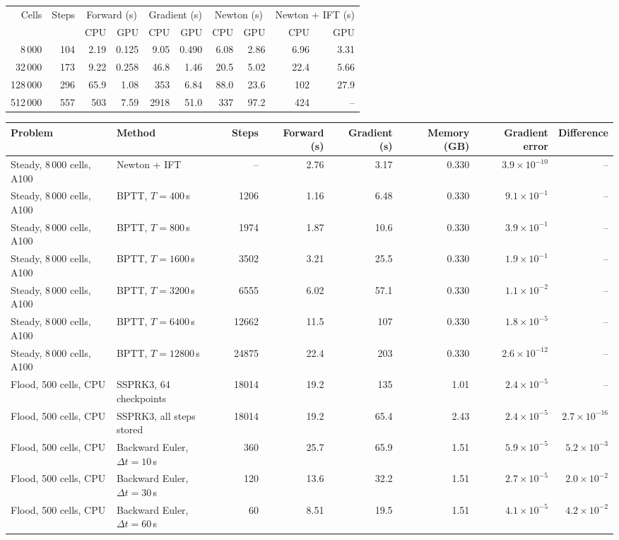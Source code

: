 \begin{tabular}{rrrrrrrrrr}
\hline
Cells & Steps & \multicolumn{2}{c}{Forward (s)} & \multicolumn{2}{c}{Gradient (s)} & \multicolumn{2}{c}{Newton (s)} & \multicolumn{2}{c}{Newton + IFT (s)} \\
 &  & CPU & GPU & CPU & GPU & CPU & GPU & CPU & GPU \\
\hline
8\,000 & 104 & 2.19 & 0.125 & 9.05 & 0.490 & 6.08 & 2.86 & 6.96 & 3.31 \\
32\,000 & 173 & 9.22 & 0.258 & 46.8 & 1.46 & 20.5 & 5.02 & 22.4 & 5.66 \\
128\,000 & 296 & 65.9 & 1.08 & 353 & 6.84 & 88.0 & 23.6 & 102 & 27.9 \\
512\,000 & 557 & 503 & 7.59 & 2918 & 51.0 & 337 & 97.2 & 424 & -- \\
\hline
\end{tabular}

\begin{tabular}{llrrrrrr}
\hline
Problem & Method & Steps & Forward (s) & Gradient (s) & Memory (GB) & Gradient error & Difference \\
\hline
Steady, 8\,000 cells, A100 & Newton + IFT & -- & 2.76 & 3.17 & 0.330 & $3.9\times10^{-10}$ & -- \\
Steady, 8\,000 cells, A100 & BPTT, $T=400$\,s & 1206 & 1.16 & 6.48 & 0.330 & $9.1\times10^{-1}$ & -- \\
Steady, 8\,000 cells, A100 & BPTT, $T=800$\,s & 1974 & 1.87 & 10.6 & 0.330 & $3.9\times10^{-1}$ & -- \\
Steady, 8\,000 cells, A100 & BPTT, $T=1600$\,s & 3502 & 3.21 & 25.5 & 0.330 & $1.9\times10^{-1}$ & -- \\
Steady, 8\,000 cells, A100 & BPTT, $T=3200$\,s & 6555 & 6.02 & 57.1 & 0.330 & $1.1\times10^{-2}$ & -- \\
Steady, 8\,000 cells, A100 & BPTT, $T=6400$\,s & 12662 & 11.5 & 107 & 0.330 & $1.8\times10^{-5}$ & -- \\
Steady, 8\,000 cells, A100 & BPTT, $T=12800$\,s & 24875 & 22.4 & 203 & 0.330 & $2.6\times10^{-12}$ & -- \\
Flood, 500 cells, CPU & SSPRK3, 64 checkpoints & 18014 & 19.2 & 135 & 1.01 & $2.4\times10^{-5}$ & -- \\
Flood, 500 cells, CPU & SSPRK3, all steps stored & 18014 & 19.2 & 65.4 & 2.43 & $2.4\times10^{-5}$ & $2.7\times10^{-16}$ \\
Flood, 500 cells, CPU & Backward Euler, $\Delta t=10$\,s & 360 & 25.7 & 65.9 & 1.51 & $5.9\times10^{-5}$ & $5.2\times10^{-3}$ \\
Flood, 500 cells, CPU & Backward Euler, $\Delta t=30$\,s & 120 & 13.6 & 32.2 & 1.51 & $2.7\times10^{-5}$ & $2.0\times10^{-2}$ \\
Flood, 500 cells, CPU & Backward Euler, $\Delta t=60$\,s & 60 & 8.51 & 19.5 & 1.51 & $4.1\times10^{-5}$ & $4.2\times10^{-2}$ \\
\hline
\end{tabular}


